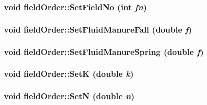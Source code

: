 \label{classfield_order_ae9dfee3dc8f17fbaa56c430927be070d}
\hypertarget{classfield_order_aeae74fa4ff075f9f86e11a6601e1f1ec}{
\subsubsection[{SetFieldNo}]{\setlength{\rightskip}{0pt plus 5cm}void fieldOrder::SetFieldNo (int {\em fn})}}
\label{classfield_order_aeae74fa4ff075f9f86e11a6601e1f1ec}
\hypertarget{classfield_order_a9ff8f81240fb283b238681dcd3514007}{
\subsubsection[{SetFluidManureFall}]{\setlength{\rightskip}{0pt plus 5cm}void fieldOrder::SetFluidManureFall (double {\em f})}}
\label{classfield_order_a9ff8f81240fb283b238681dcd3514007}
\hypertarget{classfield_order_ab19123bbac2dd1c1f4723371f97a37a0}{
\subsubsection[{SetFluidManureSpring}]{\setlength{\rightskip}{0pt plus 5cm}void fieldOrder::SetFluidManureSpring (double {\em f})}}
\label{classfield_order_ab19123bbac2dd1c1f4723371f97a37a0}
\hypertarget{classfield_order_ad1b2b349916029c18cd68279cf273786}{
\subsubsection[{SetK}]{\setlength{\rightskip}{0pt plus 5cm}void fieldOrder::SetK (double {\em k})}}
\label{classfield_order_ad1b2b349916029c18cd68279cf273786}
\hypertarget{classfield_order_a88943af80816ed879533b2cc5dbc3f2b}{
\subsubsection[{SetN}]{\setlength{\rightskip}{0pt plus 5cm}void fieldOrder::SetN (double {\em n})}}

